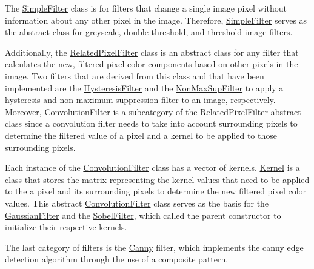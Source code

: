 The \hyperlink{classSimpleFilter}{Simple\+Filter} class is for filters that change a single image pixel without information about any other pixel in the image. Therefore, \hyperlink{classSimpleFilter}{Simple\+Filter} serves as the abstract class for greyscale, double threshold, and threshold image filters.



Additionally, the \hyperlink{classRelatedPixelFilter}{Related\+Pixel\+Filter} class is an abstract class for any filter that calculates the new, filtered pixel color components based on other pixels in the image. Two filters that are derived from this class and that have been implemented are the \hyperlink{classHysteresisFilter}{Hysteresis\+Filter} and the \hyperlink{classNonMaxSupFilter}{Non\+Max\+Sup\+Filter} to apply a hysteresis and non-\/maximum suppression filter to an image, respectively. Moreover, \hyperlink{classConvolutionFilter}{Convolution\+Filter} is a subcategory of the \hyperlink{classRelatedPixelFilter}{Related\+Pixel\+Filter} abstract class since a convolution filter needs to take into account surrounding pixels to determine the filtered value of a pixel and a kernel to be applied to those surrounding pixels.



Each instance of the \hyperlink{classConvolutionFilter}{Convolution\+Filter} class has a vector of kernels. \hyperlink{classKernel}{Kernel} is a class that stores the matrix representing the kernel values that need to be applied to the a pixel and its surrounding pixels to determine the new filtered pixel color values. This abstract \hyperlink{classConvolutionFilter}{Convolution\+Filter} class serves as the basis for the \hyperlink{classGaussianFilter}{Gaussian\+Filter} and the \hyperlink{classSobelFilter}{Sobel\+Filter}, which called the parent constructor to initialize their respective kernels.



The last category of filters is the \hyperlink{classCanny}{Canny} filter, which implements the canny edge detection algorithm through the use of a composite pattern.



